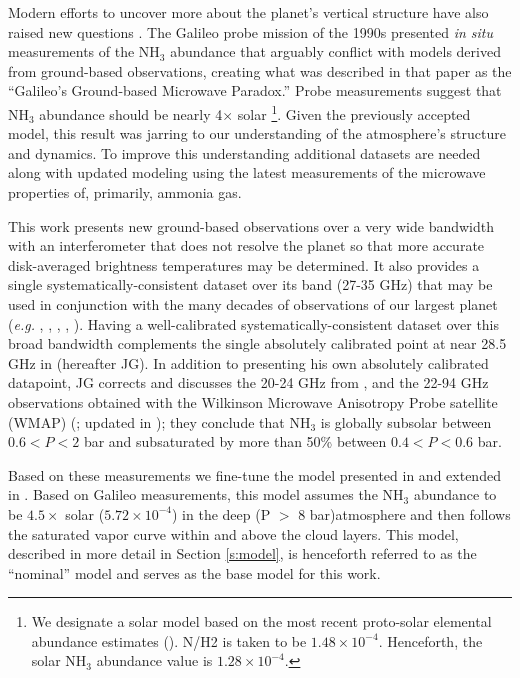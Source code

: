 \documentclass{article}
\newcommand{\e}[1]{\times 10^{#1}}
\begin{document}
	Modern efforts to uncover more about the planet's vertical structure have also raised new questions \citep{2005Icar..173..425D}.
	The Galileo probe mission of the 1990s presented {\sl in situ} measurements of the NH$_{3}$ abundance that arguably conflict with models derived from ground-based observations, creating what was described in that paper as the ``Galileo's Ground-based Microwave Paradox.''
	Probe measurements suggest that NH$_{3}$ abundance should be nearly 4$\times$ solar
		\footnote{We designate a solar model based on the most recent proto-solar elemental abundance estimates (\citealt{2009ARA&A..47..481A}). N/H2 is taken to be $1.48 \e{-4}$. Henceforth, the solar NH$_{3}$ abundance value is $1.28 \e{-4}$.}. 
	Given the previously accepted model, this result was jarring to our understanding of the atmosphere's structure and dynamics.  To improve this understanding additional datasets are needed along with updated modeling using the latest measurements of the microwave properties of, primarily, ammonia gas.

	This work presents new ground-based observations over a very wide bandwidth with an interferometer that does not resolve the planet so that more accurate disk-averaged brightness temperatures may be determined.  It also provides a single systematically-consistent dataset over its band (27-35 GHz) that may be used in conjunction with the many decades of observations of our largest planet ({\em e.g.} \citealt{1978Icar...35...44K}, \citealt{2003ApJS..148...39P}, \citealt{2011ApJS..192...19W}, \citealt{2005Icar..173..439G}, \citealt{2016Sci...352.1198D}).
	Having a well-calibrated systematically-consistent dataset over this broad bandwidth complements the single absolutely calibrated point at near 28.5 GHz in \citealt{2005Icar..173..439G} (hereafter JG).
	 In addition to presenting his own absolutely calibrated datapoint, JG corrects and discusses the 20-24 GHz from \citealt{1978Icar...35...44K}, and the 22-94 GHz observations obtained with the Wilkinson Microwave Anisotropy Probe satellite (WMAP) (\citealt{2003ApJS..148...39P}; updated in \citealt{2011ApJS..192...19W}); they conclude that NH$_{3}$ is globally subsolar between $0.6 < P < 2$ bar and subsaturated by more than 50\% between $0.4 < P < 0.6$ bar.
	 
	Based on these measurements we fine-tune the model presented in \citealt{2001Icar..149...66D} and extended in \citealt{2016Sci...352.1198D}. Based on Galileo measurements, this model assumes the NH$_{3}$ abundance to be $4.5 \times$ solar ($5.72 \e{-4}$) in the deep (P $>$ 8 bar)atmosphere and then follows the saturated vapor curve within and above the cloud layers.
	This model, described in more detail in Section \ref{s:model}, is henceforth referred to as the ``nominal'' model and serves as the base model for this work.
\end{document}
